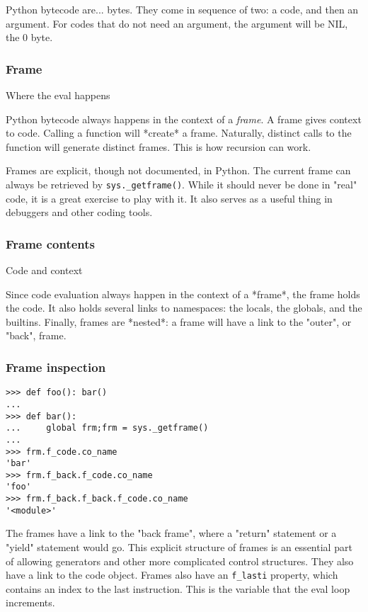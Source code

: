 Python bytecode are...
bytes.
They come in sequence of two:
a code,
and then an argument.
For codes that do not need an argument,
the argument will be NIL,
the 0 byte.

\begin{frame}
\frametitle{Frame}

Where the eval happens
\end{frame}

Python bytecode always happens in the context of a
{\em frame}.
A frame gives context to code.
Calling a function will
*create*
a frame.
Naturally,
distinct calls to the function
will generate distinct frames.
This is how recursion can work.

Frames are explicit,
though not documented,
in Python.
The current frame can always be retrieved by
\verb|sys._getframe()|.
While it should never be done in
"real"
code,
it is a great exercise to play with it.
It also serves as a useful thing in debuggers
and other coding tools.

\begin{frame}
\frametitle{Frame contents}

Code and context
\end{frame}

Since code evaluation always happen in the context of a
*frame*,
the frame holds the code.
It also holds several links to namespaces:
the locals, the globals, and the builtins.
Finally,
frames are
*nested*:
a frame will have a link to the "outer",
or "back",
frame.



\begin{frame}[fragile]
\frametitle{Frame inspection}

\begin{lstlisting}
>>> def foo(): bar()
... 
>>> def bar():
...     global frm;frm = sys._getframe()
... 
>>> frm.f_code.co_name
'bar'
>>> frm.f_back.f_code.co_name
'foo'
>>> frm.f_back.f_back.f_code.co_name
'<module>'
\end{lstlisting}
\end{frame}

The frames have a link to the "back frame",
where a "return" statement or a "yield" statement would go.
This explicit structure of frames is an essential part of allowing
generators and other more complicated control structures.
They also have a link to the code object.
Frames also have an \verb|f_lasti| property,
which contains an index to the last instruction.
This is the variable that the eval loop increments.

